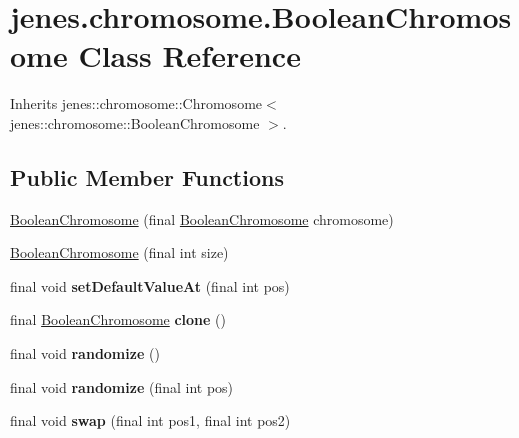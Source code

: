 \hypertarget{classjenes_1_1chromosome_1_1_boolean_chromosome}{
\section{jenes.chromosome.BooleanChromosome Class Reference}
\label{classjenes_1_1chromosome_1_1_boolean_chromosome}
}
Inherits jenes::chromosome::Chromosome$<$ jenes::chromosome::BooleanChromosome $>$.

\subsection*{Public Member Functions}
\begin{CompactItemize}
\item 
\hyperlink{classjenes_1_1chromosome_1_1_boolean_chromosome_dd8b8de56dc676084576bcc657125414}{BooleanChromosome} (final \hyperlink{classjenes_1_1chromosome_1_1_boolean_chromosome}{BooleanChromosome} chromosome)
\item 
\hyperlink{classjenes_1_1chromosome_1_1_boolean_chromosome_ea950688e012d2bfe97f4f24a3fc1db6}{BooleanChromosome} (final int size)
\item 
\hypertarget{classjenes_1_1chromosome_1_1_boolean_chromosome_df2084640bd92e4d36ffea9142e39f8e}{
final void \textbf{setDefaultValueAt} (final int pos)}
\label{classjenes_1_1chromosome_1_1_boolean_chromosome_df2084640bd92e4d36ffea9142e39f8e}

\item 
\hypertarget{classjenes_1_1chromosome_1_1_boolean_chromosome_0f0ea11e413734e15dc659a3d0831801}{
final \hyperlink{classjenes_1_1chromosome_1_1_boolean_chromosome}{BooleanChromosome} \textbf{clone} ()}
\label{classjenes_1_1chromosome_1_1_boolean_chromosome_0f0ea11e413734e15dc659a3d0831801}

\item 
\hypertarget{classjenes_1_1chromosome_1_1_boolean_chromosome_b02039091f6803486d54b4f124a39b63}{
final void \textbf{randomize} ()}
\label{classjenes_1_1chromosome_1_1_boolean_chromosome_b02039091f6803486d54b4f124a39b63}

\item 
\hypertarget{classjenes_1_1chromosome_1_1_boolean_chromosome_f0249c8a5452c3a13960543ab23d4aae}{
final void \textbf{randomize} (final int pos)}
\label{classjenes_1_1chromosome_1_1_boolean_chromosome_f0249c8a5452c3a13960543ab23d4aae}

\item 
\hypertarget{classjenes_1_1chromosome_1_1_boolean_chromosome_6359dc1f495e4f7967c6a84f3206de40}{
final void \textbf{swap} (final int pos1, final int pos2)}
\label{classjenes_1_1chromosome_1_1_boolean_chromosome_6359dc1f495e4f7967c6a84f3206de40}


\end{CompactItemize}
